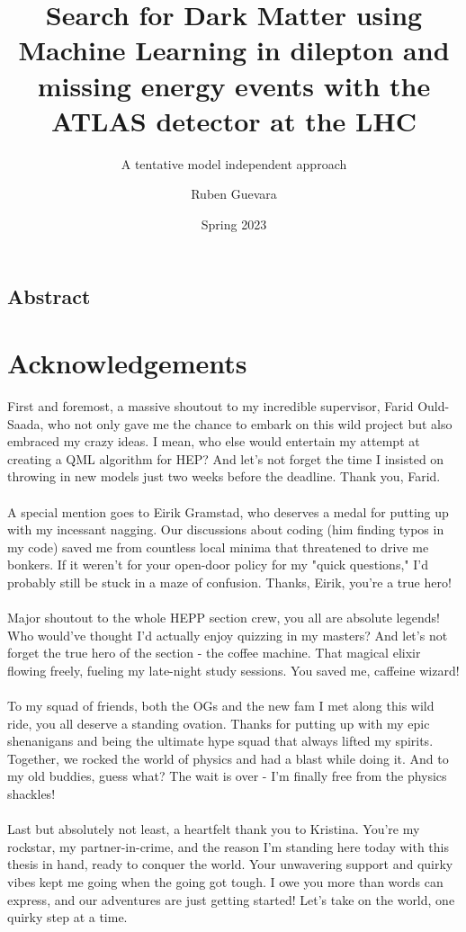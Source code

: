 \documentclass[12pt, a4paper]{book}
\title{Search for Dark Matter using Machine Learning in dilepton and missing energy events with the ATLAS detector at the LHC}
\subtitle{A tentative model independent approach}
\author{Ruben Guevara}
\date{Spring 2023}
\begin{document}

\uiomasterfp[
colour = pink,
dept = {Department of Physics},
long,
program = {Physics: Nuclear and Particle Physics},
supervisors = {Professor Farid Ould-Saada \and Dr. Eirik Gramstad},
]

\newpage
\begin{center}
\section*{Abstract}
\end{center}
	


\newpage
\section*{Acknowledgements}
First and foremost, a massive shoutout to my incredible supervisor, Farid Ould-Saada, who not only gave me the chance to embark on this wild project but also embraced my crazy ideas. I mean, who else would entertain my attempt at creating a QML algorithm for HEP? And let's not forget the time I insisted on throwing in new models just two weeks before the deadline. Thank you, Farid. \\
\\A special mention goes to Eirik Gramstad, who deserves a medal for putting up with my incessant nagging. Our discussions about coding (him finding typos in my code) saved me from countless local minima that threatened to drive me bonkers. If it weren't for your open-door policy for my "quick questions," I'd probably still be stuck in a maze of confusion. Thanks, Eirik, you're a true hero!\\
\\Major shoutout to the whole HEPP section crew, you all are absolute legends! Who would've thought I'd actually enjoy quizzing in my masters? And let's not forget the true hero of the section - the coffee machine. That magical elixir flowing freely, fueling my late-night study sessions. You saved me, caffeine wizard!\\
\\To my squad of friends, both the OGs and the new fam I met along this wild ride, you all deserve a standing ovation. Thanks for putting up with my epic shenanigans and being the ultimate hype squad that always lifted my spirits. Together, we rocked the world of physics and had a blast while doing it. And to my old buddies, guess what? The wait is over - I'm finally free from the physics shackles!\\
\\Last but absolutely not least, a heartfelt thank you to Kristina. You're my rockstar, my partner-in-crime, and the reason I'm standing here today with this thesis in hand, ready to conquer the world. Your unwavering support and quirky vibes kept me going when the going got tough. I owe you more than words can express, and our adventures are just getting started! Let's take on the world, one quirky step at a time.
\end{document}
